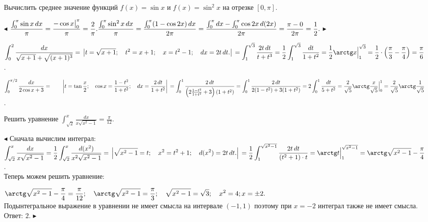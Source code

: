 \documentclass[a5paper,10pt]{article}
\begin{document}
\medskip
{} Вычислить среднее значение функций $f(x)=\sin x$ и
$f(x)=\sin^2x$ на отрезке $[0,\pi]$.

\smallskip
\noindent $\blacktriangleleft$ $\displaystyle \frac{\int_0^{\pi}\sin x\,dx}{\pi}=
\frac{-\cos x\big|_0^{\pi}}{\pi}=\frac {2}{\pi}.\\
\frac{\int_0^{\pi}\sin^2 x\,dx}{\pi}=\frac{\int_0^{\pi}(1-\cos 2x)\,dx}{2\pi}=
\frac{\int_0^{\pi}dx-\int_0^{\pi}\cos 2x\,d(2x)}{2\pi}=\frac{\pi-0}{2\pi}=\frac12.$
$\blacktriangleright$

\medskip
{} $\displaystyle \int_0^2\frac{dx}{\sqrt{x+1}+\sqrt{(x+1)^3}}=\\
\left|t=\sqrt{x+1};\quad t^2=x+1;\quad x=t^2-1;\quad dx=2t\,dt.\right|\\
=\int_1^{\sqrt3}\frac{2t\,dt}{t+t^3}=\frac12\int_1^{\sqrt3}\frac{dt}{1+t^2}=
\frac12\arctg x\Big|_1^{\sqrt3}=\frac12\cdot\left(\frac{\pi}{3}-\frac{\pi}{4}\right)=
\frac{\pi}{6}$.

\medskip
{} $\displaystyle \int_0^{\pi/2}\frac{dx}{2\cos x+3}=\qquad
\left|t=\tan\frac x2;\quad\cos x=\frac{1-t^2}{1+t^2};\quad dx=\frac{2\,dt}{1+t^2}\right|\\
=\int_0^1\frac{2\,dt}{\left(2\frac{1-t^2}{1+t^2}+3\right)(1+t^2)}=
\int_0^1\frac{2\,dt}{2(1-t^2)+3(1+t^2)}=2\int_0^1\frac{dt}{5+t^2}=\\
\frac{2}{\sqrt5}\arctg\frac{x}{\sqrt5}\Big|_0^1=
\frac{2}{\sqrt5}\arctg\frac{1}{\sqrt5}$.

\medskip
{} Решить уравнение
$\displaystyle \int_{\sqrt2}^x\frac{dx}{x\sqrt{x^2-1}}=\frac{\pi}{12}$.

\smallskip
\noindent $\blacktriangleleft$ Сначала вычислим интеграл: $\displaystyle
\int_{\sqrt2}^x\frac{dx}{x\sqrt{x^2-1}}=
\frac12\int_{\sqrt2}^x\frac{d(x^2)}{x^2\sqrt{x^2-1}}=\\
\left|\sqrt{x^2-1}=t;\quad x^2=t^2+1;\quad d(x^2)=2t\,dt.\right|\\
=\frac12\int_1^{\sqrt{x^2-1}}\frac{2t\,dt}{(t^2+1)\cdot t}=\arctg t\Big|_1^{\sqrt{x^2-1}}=
\arctg\sqrt{x^2-1}-\frac{\pi}{4}$.\\

\smallskip\noindent Теперь можем решить уравнение:

\smallskip\noindent
$\displaystyle\arctg\sqrt{x^2-1}-\frac{\pi}{4}=\frac{\pi}{12};\quad
\arctg\sqrt{x^2-1}=\frac{\pi}{3};\quad \sqrt{x^2-1}=\sqrt{3};\quad x^2=4;\\
x=\pm2.$\\
Подынтегральное выражение в уравнении не имеет смысла на интервале
$(-1,1)$ поэтому при $x=-2$ интеграл также не имеет смысла. Ответ: $2$.
$\blacktriangleright$
\end{document}
